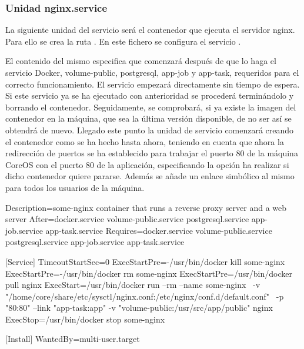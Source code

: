 \subsubsection{Unidad nginx.service}

La siguiente unidad del servicio será el contenedor que ejecuta el servidor nginx. Para ello se crea la ruta . En este fichero se configura el servicio .

El contenido del mismo especifica que comenzará después de que lo haga el servicio Docker, volume-public, postgresql, app-job y app-task, requeridos para el correcto funcionamiento. El servicio empezará directamente sin tiempo de espera. Si este servicio ya se ha ejecutado con anterioridad se procederá terminándolo y borrando el contenedor. Seguidamente, se comprobará, si ya existe la imagen del contenedor en la máquina, que sea la última versión disponible, de no ser así se obtendrá de nuevo. Llegado este punto la unidad de servicio comenzará creando el contenedor como se ha hecho hasta ahora, teniendo en cuenta que ahora la redirección de puertos se ha establecido para trabajar el puerto 80 de la máquina CoreOS con el puerto 80 de la aplicación, especificando la opción ha realizar si dicho contenedor quiere pararse. Además se añade un enlace simbólico al mismo para todos los usuarios de la máquina. 

\begin{codelisting}
\label{code:nginx.service}
\begin{code}
[Unit] 
  Description=some-nginx container that runs a reverse proxy server and a 
              web server
  After=docker.service volume-public.service postgresql.service app-job.service 
        app-task.service
  Requires=docker.service volume-public.service postgresql.service 
           app-job.service app-task.service

[Service] 
  TimeoutStartSec=0 
  ExecStartPre=-/usr/bin/docker kill some-nginx 
  ExecStartPre=-/usr/bin/docker rm some-nginx
  ExecStartPre=/usr/bin/docker pull nginx 
  ExecStart=/usr/bin/docker run --rm --name some-nginx \
  -v "/home/core/share/etc/sysctl/nginx.conf:/etc/nginx/conf.d/default.conf" \
  -p "80:80" --link "app-task:app" -v "volume-public:/usr/src/app/public" nginx 
  ExecStop=/usr/bin/docker stop some-nginx

[Install] 
  WantedBy=multi-user.target
\end{code}
\end{codelisting}

